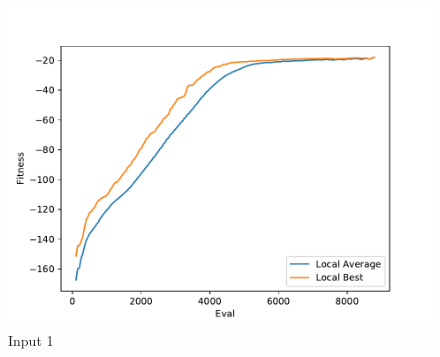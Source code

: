 \documentclass{standalone}
\begin{document}
\begin{figure}[!htb]
	\caption{Input 1}
	\label{fig:graph_1072}
	\includegraphics[width=\textwidth]{../graphs/graphs/1072.pdf}
\end{figure}
\end{document}
